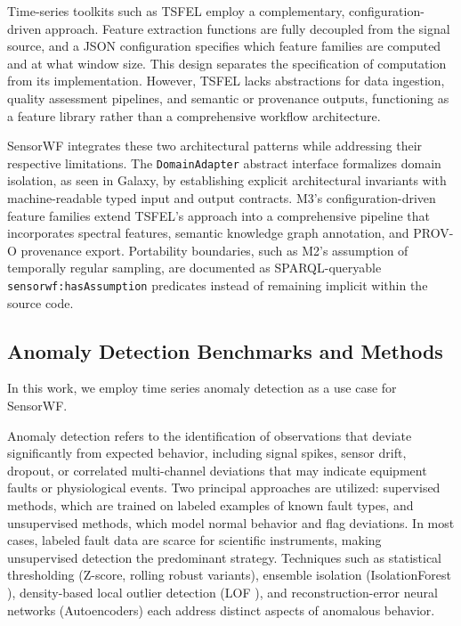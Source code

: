 \documentclass[conference]{IEEEtran}
\begin{document}
Time-series toolkits such as TSFEL \cite{barandas2020tsfel} employ a complementary, configuration-driven approach. Feature extraction functions are fully decoupled from the signal source, and a JSON configuration specifies which feature families are computed and at what window size. This design separates the specification of computation from its implementation. However, TSFEL lacks abstractions for data ingestion, quality assessment pipelines, and semantic or provenance outputs, functioning as a feature library rather than a comprehensive workflow architecture.

SensorWF integrates these two architectural patterns while addressing their respective limitations. The \texttt{DomainAdapter} abstract interface formalizes domain isolation, as seen in Galaxy, by establishing explicit architectural invariants with machine-readable typed input and output contracts. M3's configuration-driven feature families extend TSFEL's approach into a comprehensive pipeline that incorporates spectral features, semantic knowledge graph annotation, and PROV-O provenance export. Portability boundaries, such as M2's assumption of temporally regular sampling, are documented as SPARQL-queryable \texttt{sensorwf:hasAssumption} predicates instead of remaining implicit within the source code.


\subsection{Anomaly Detection Benchmarks and Methods}

In this work, we employ time series anomaly detection as a use case for SensorWF. 

Anomaly detection refers to the identification of observations that deviate significantly from expected behavior, including signal spikes, sensor drift, dropout, or correlated multi-channel deviations that may indicate equipment faults or physiological events. Two principal approaches are utilized: supervised methods, which are trained on labeled examples of known fault types, and unsupervised methods, which model normal behavior and flag deviations. In most cases, labeled fault data are scarce for scientific instruments, making unsupervised detection the predominant strategy. Techniques such as statistical thresholding (Z-score, rolling robust variants), ensemble isolation (IsolationForest \cite{liu2008isolation}), density-based local outlier detection (LOF \cite{breunig2000lof}), and reconstruction-error neural networks (Autoencoders) each address distinct aspects of anomalous behavior.
\end{document}
